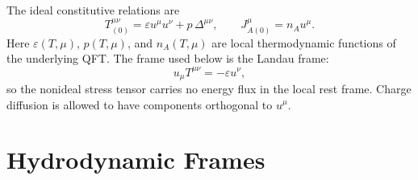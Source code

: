 The ideal constitutive relations are
\begin{equation}
  T^{\mu\nu}_{(0)}
  =
  \varepsilon u^\mu u^\nu
  +p\,\Delta^{\mu\nu},
  \qquad
  J^\mu_{A(0)}=n_Au^\mu .
  \label{eq:hydro-ideal-constitutive-relations}
\end{equation}
Here \(\varepsilon(T,\mu)\), \(p(T,\mu)\), and \(n_A(T,\mu)\) are local
thermodynamic functions of the underlying QFT.  The frame used below is the
Landau frame:
\begin{equation}
  u_\mu T^{\mu\nu}=-\varepsilon u^\nu,
  \label{eq:hydro-landau-frame}
\end{equation}
so the nonideal stress tensor carries no energy flux in the local rest
frame.  Charge diffusion is allowed to have components orthogonal to
\(u^\mu\).

\section{Hydrodynamic Frames}

